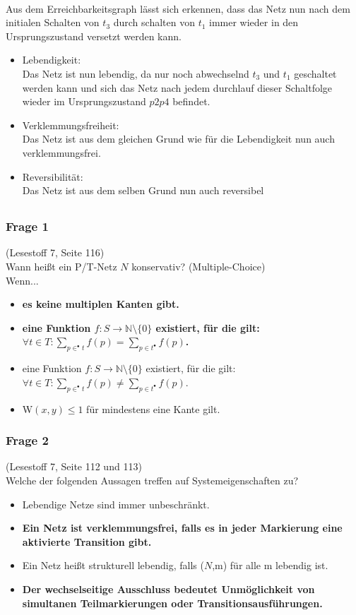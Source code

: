 \documentclass[a4paper,12pt]{scrartcl}
\begin{document}
\\
Aus dem Erreichbarkeitsgraph lässt sich erkennen, dass
das Netz nun nach dem initialen Schalten von $t_3$ durch 
schalten von $t_1$ immer wieder in den Ursprungszustand 
versetzt werden kann.
\begin{itemize}
  \item{Lebendigkeit:}\\
    Das Netz ist nun lebendig, da nur noch abwechselnd $t_3$ und $t_1$ geschaltet werden kann und sich das Netz nach jedem durchlauf dieser Schaltfolge wieder im Ursprungszustand $p2p4$ befindet.  
  \item{Verklemmungsfreiheit:}\\
    Das Netz ist aus dem gleichen Grund wie für die 
    Lebendigkeit nun auch verklemmungsfrei.
  \item{Reversibilität:}\\
    Das Netz ist aus dem selben Grund nun auch 
    reversibel

\end{itemize}
\subsection{}
\subsubsection*{Frage 1}
(Lesestoff 7, Seite 116)\\
Wann heißt ein P/T-Netz $N$ konservativ? (Multiple-Choice)\\
Wenn...
\begin{itemize}
\item \textbf{es keine multiplen Kanten gibt.}
\item \textbf{eine Funktion $f:S \to \mathbb{N}\setminus \{ 0 \}$ existiert, für die gilt:$\forall t \in T: \sum_{p \in ^{\bullet}t}f(p) = \sum_{p \in t^{\bullet}}f(p)$.}
\item eine Funktion $f:S \to \mathbb{N}\setminus \{ 0 \}$ existiert, für die gilt:$\forall t \in T: \sum_{p \in ^{\bullet}t}f(p) \neq \sum_{p \in t^{\bullet}}f(p)$.
\item W$(x,y)\leq 1$ für mindestens eine Kante gilt. 
\end{itemize}
\subsubsection*{Frage 2}
(Lesestoff 7, Seite 112 und 113)\\
Welche der folgenden Aussagen treffen auf Systemeigenschaften zu?
\begin{itemize}
\item Lebendige Netze sind immer unbeschränkt.
\item \textbf{Ein Netz ist verklemmungsfrei, falls es in jeder Markierung eine aktivierte Transition gibt.}
\item Ein Netz heißt strukturell lebendig, falls ($N$,m) für alle m lebendig ist.
\item \textbf{Der wechselseitige Ausschluss bedeutet Unmöglichkeit von simultanen Teilmarkierungen oder Transitionsausführungen.}
\end{itemize}
\end{document}
